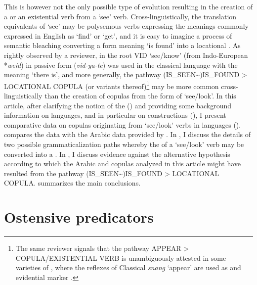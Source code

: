 \documentclass[output=paper]{langsci/langscibook}
\begin{document}
This is however not the only possible type of evolution resulting in the creation of a  or an existential verb from a ‘see’ verb. Cross-linguistically, the translation equivalents of ‘see’ may be polysemous verbs expressing the meanings commonly expressed in English as ‘find’ or ‘get’, and it is easy to imagine a process of semantic bleaching converting a form meaning ‘is found’ into a locational . As rightly observed by a reviewer, in  the root VID ‘see/know’ (from Indo-European *\textit{weid}) in passive form (\textit{vid-ya-te}) was used in the classical language with the meaning ‘there is’, and more generally, the pathway (IS\_SEEN{\textasciitilde})IS\_FOUND > LOCATIONAL COPULA (or variants thereof)\footnote{The same reviewer signals that the pathway APPEAR > COPULA/EXISTENTIAL VERB is unambiguously attested in some varieties of , where the reflexes of Classical  \textit{snang} ‘appear’ are used as  and evidential marker \citep{Suzuki2012}.} may be more common cross-linguistically than the creation of copulas from the  form of ‘see\slash look’.
In this article, after clarifying the notion of the   () and providing some background information on  languages, and in particular on   constructions (), I present comparative data on copulas originating from ‘see\slash look’ verbs in  languages ().  compares the  data with the Arabic data provided by \citet{Taine-Cheikh2013}. In , I discuss the details of two possible grammaticalization paths whereby the  of a ‘see\slash look’ verb may be converted into a . In , I discuss evidence against the alternative hypothesis according to which the Arabic and  copulas analyzed in this article might have resulted from the pathway (IS\_SEEN{\textasciitilde})IS\_FOUND > LOCATIONAL COPULA.  summarizes the main conclusions.

\section{Ostensive predicators}\label{sec:creissels:2}
\end{document}
